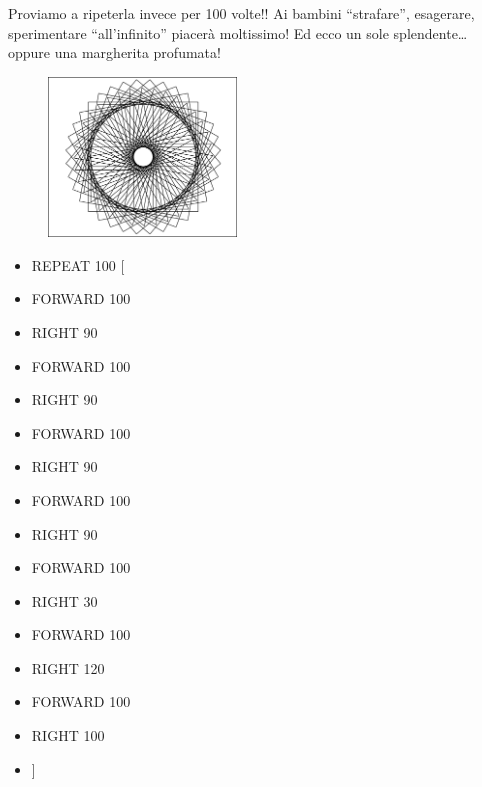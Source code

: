 Proviamo a ripeterla invece per 100 volte!! Ai bambini “strafare”, esagerare,
sperimentare “all’infinito” piacerà moltissimo! Ed ecco un sole splendente…
oppure una margherita profumata!

\begin{minipage}{0.5\textwidth}
\begin{figure}[H]
   \includegraphics[width=5.0cm,trim=4 4 6 4,clip]{./images/marta/mar-7.png}
   \label{mar-7}
\end{figure}
\end{minipage} \hfill
\begin{minipage}{0.45\textwidth}
\begin{itemize}[itemsep=-3pt,parsep=2pt]
 
\item[] \hspace{0.5cm} REPEAT 100 [
\item[] \hspace{0.5cm} 	FORWARD 100
\item[] \hspace{0.5cm} 	RIGHT 90
\item[] \hspace{0.5cm} 	FORWARD 100
\item[] \hspace{0.5cm} 	RIGHT 90
\item[] \hspace{0.5cm} 	FORWARD 100
\item[] \hspace{0.5cm} 	RIGHT 90
\item[] \hspace{0.5cm} 	FORWARD 100
\item[] \hspace{0.5cm} 	RIGHT 90
\item[] \hspace{0.5cm} 	FORWARD 100
\item[] \hspace{0.5cm} 	RIGHT 30
\item[] \hspace{0.5cm} 	FORWARD 100
\item[] \hspace{0.5cm} 	RIGHT 120
\item[] \hspace{0.5cm} 	FORWARD 100
\item[] \hspace{0.5cm} 	RIGHT 100
\item[] \hspace{0.5cm}  ]
\end{itemize}          	          
\end{minipage}

